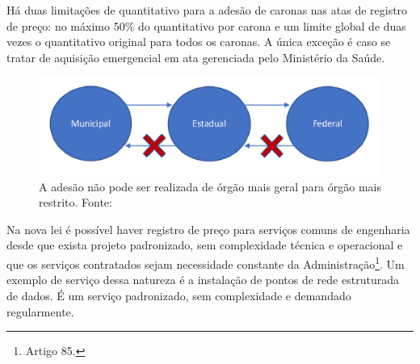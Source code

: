 Há duas limitações de quantitativo para a adesão de caronas nas atas de registro de preço: no máximo 50\% do quantitativo por carona e um limite global de duas vezes o quantitativo original para todos os caronas. A única exceção é caso se tratar de aquisição emergencial em ata gerenciada pelo Ministério da Saúde.

\begin{figure}
    \centering
    \includegraphics[scale=0.35]{conteudo/imagens/srp-adesao.png}
    \caption{A adesão não pode ser realizada de órgão mais geral para órgão mais restrito. Fonte: \citet{TCE2023}}
    \label{fig:srp-adesao}
\end{figure}

Na nova lei é possível haver registro de preço para serviços comuns de engenharia desde que exista projeto padronizado, sem complexidade técnica e operacional e que os serviços contratados sejam necessidade constante da Administração\footnote{Artigo 85.}. Um exemplo de serviço dessa natureza é a instalação de pontos de rede estruturada de dados. É um serviço padronizado, sem complexidade e demandado regularmente.